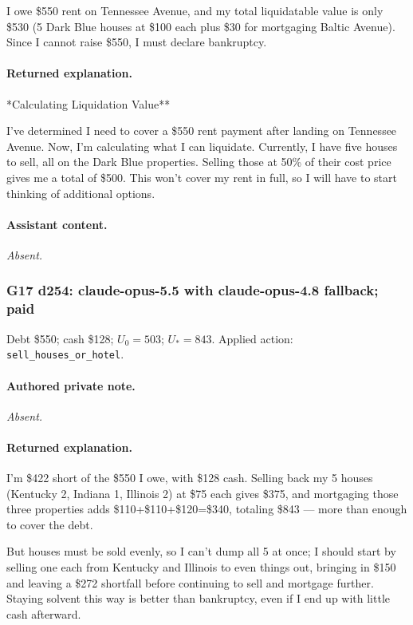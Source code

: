 {\small I owe \$550 rent on Tennessee Avenue, and my total liquidatable value is only \$530 (5 Dark Blue houses at \$100 each plus \$30 for mortgaging Baltic Avenue). Since I cannot raise \$550, I must declare bankruptcy.\par}

\paragraph{Returned explanation.}

{\small **Calculating Liquidation Value**
\par
I've determined I need to cover a \$550 rent payment after landing on Tennessee Avenue. Now, I'm calculating what I can liquidate. Currently, I have five houses to sell, all on the Dark Blue properties. Selling those at 50\% of their cost price gives me a total of \$500. This won't cover my rent in full, so I will have to start thinking of additional options.
\par

\par}

\paragraph{Assistant content.}

\textit{Absent.}

\medskip

\subsubsection*{G17 d254: claude-opus-5.5 with claude-opus-4.8 fallback; paid}

Debt \$550; cash \$128; $U_0=503$; $U_*=843$. Applied action: \texttt{sell\_houses\_or\_hotel}.

\paragraph{Authored private note.}

\textit{Absent.}

\paragraph{Returned explanation.}

{\small I'm \$422 short of the \$550 I owe, with \$128 cash. Selling back my 5 houses (Kentucky 2, Indiana 1, Illinois 2) at \$75 each gives \$375, and mortgaging those three properties adds \$110+\$110+\$120=\$340, totaling \$843 — more than enough to cover the debt.
\par
But houses must be sold evenly, so I can't dump all 5 at once; I should start by selling one each from Kentucky and Illinois to even things out, bringing in \$150 and leaving a \$272 shortfall before continuing to sell and mortgage further. Staying solvent this way is better than bankruptcy, even if I end up with little cash afterward.
\par
\par}

